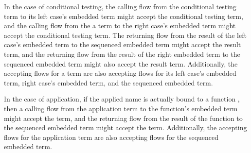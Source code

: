 \documentclass[letterpaper, 11pt]{extarticle}
\begin{document}
In the case of conditional testing, the calling flow from the conditional testing term to
its left case's embedded term might accept the conditional testing term, and
the calling flow from the a term to
the right case's embedded term might accept the conditional testing term.
The returning flow from the result of the
left case's embedded term to the sequenced embedded term might accept the result term,
and the returning flow from the result of the right embedded term to the sequenced embedded term
might also accept the result term.  Additionally, the accepting flows for a term are also
accepting flows for its left case's embedded term, right case's embedded term,
and the sequenced embedded term.   

In the case of application, if the applied name is actually bound to a function
, then a calling flow from the application term to the function's embedded term
might accept the term, and the returning flow from the result of the function
 to the sequenced embedded term might accept the term.
Additionally, the accepting flows for the application term are also
accepting flows for the sequenced embedded term. 
\end{document}
